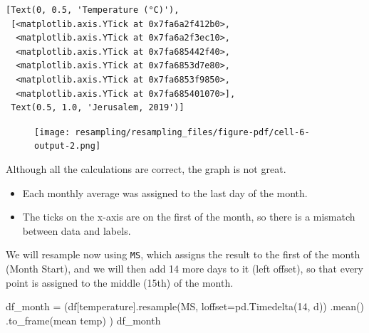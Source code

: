 \documentclass[
  letterpaper,
  DIV=11,
  numbers=noendperiod,
  oneside]{scrreprt}
\newenvironment{Shaded}{\begin{snugshade}}{\end{snugshade}}
\newcommand{\DecValTok}[1]{\textcolor[rgb]{0.68,0.00,0.00}{#1}}
\newcommand{\NormalTok}[1]{\textcolor[rgb]{0.00,0.23,0.31}{#1}}
\newcommand{\OperatorTok}[1]{\textcolor[rgb]{0.37,0.37,0.37}{#1}}
\newcommand{\StringTok}[1]{\textcolor[rgb]{0.13,0.47,0.30}{#1}}
\providecommand{\tightlist}{%
  \setlength{\itemsep}{0pt}\setlength{\parskip}{0pt}}\usepackage{longtable,booktabs,array}
\begin{document}
\begin{verbatim}
[Text(0, 0.5, 'Temperature (°C)'),
 [<matplotlib.axis.YTick at 0x7fa6a2f412b0>,
  <matplotlib.axis.YTick at 0x7fa6a2f3ec10>,
  <matplotlib.axis.YTick at 0x7fa685442f40>,
  <matplotlib.axis.YTick at 0x7fa6853d7e80>,
  <matplotlib.axis.YTick at 0x7fa6853f9850>,
  <matplotlib.axis.YTick at 0x7fa685401070>],
 Text(0.5, 1.0, 'Jerusalem, 2019')]
\end{verbatim}

\begin{figure}[H]

{\centering \texttt{[image: resampling/resampling\_files/figure-pdf/cell-6-output-2.png]}

}

\end{figure}

Although all the calculations are correct, the graph is not great.

\begin{itemize}
\tightlist
\item
  Each monthly average was assigned to the last day of the month.
\item
  The ticks on the x-axis are on the first of the month, so there is a
  mismatch between data and labels.
\end{itemize}

We will resample now using \texttt{MS}, which assigns the result to the
first of the month (Month Start), and we will then add 14 more days to
it (left offset), so that every point is assigned to the middle (15th)
of the month.

\begin{Shaded}
\begin{Highlighting}[]
\NormalTok{df\_month }\OperatorTok{=}\NormalTok{ (df[}\StringTok{\textquotesingle{}temperature\textquotesingle{}}\NormalTok{].resample(}\StringTok{\textquotesingle{}MS\textquotesingle{}}\NormalTok{,}
\NormalTok{                                       loffset}\OperatorTok{=}\NormalTok{pd.Timedelta(}\DecValTok{14}\NormalTok{, }\StringTok{\textquotesingle{}d\textquotesingle{}}\NormalTok{))}
\NormalTok{                             .mean()}
\NormalTok{                             .to\_frame(}\StringTok{\textquotesingle{}mean temp\textquotesingle{}}\NormalTok{)}
\NormalTok{           )}
\NormalTok{df\_month}
\end{Highlighting}
\end{Shaded}
\end{document}
